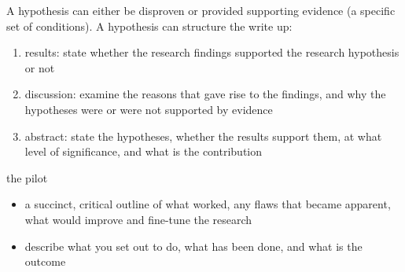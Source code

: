 \documentclass[10pt,a4paper,twocolumn]{article}
\begin{document}
A hypothesis can either be disproven or provided supporting evidence (a specific set of
conditions). A hypothesis can structure the write up:
\begin{enumerate}
  \item results: state whether the research findings supported the research hypothesis or not
  \item discussion: examine the reasons that gave rise to the findings, and why the hypotheses
  were or were not supported by evidence
  \item abstract: state the hypotheses, whether the results support them, at what level
  of significance, and what is the contribution
\end{enumerate}

the pilot
\begin{itemize}
  \item a succinct, critical outline of what worked, any flaws that became apparent, what
  would improve and fine-tune the research
  \item describe what you set out to do, what has been done, and what is the outcome
\end{itemize}
\end{document}
